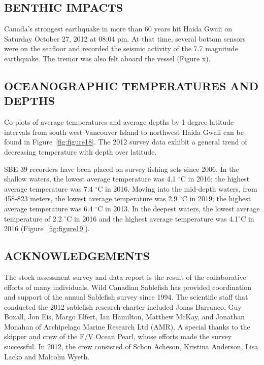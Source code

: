 \documentclass[12pt]{article}\usepackage[]{graphicx}\usepackage[]{color}
\begin{document}
\hypertarget{benthic-impacts}{%
\subsection{BENTHIC IMPACTS}\label{benthic-impacts}}

Canada's strongest earthquake in more than 60 years hit Haida Gwaii on Saturday October 27, 2012 at 08:04 pm. At that time, several bottom sensors were on the seafloor and recorded the seismic activity of the 7.7 magnitude earthquake. The tremor was also felt aboard the vessel (Figure x).

\hypertarget{oceanographic-temperatures-and-depths}{%
\subsection{OCEANOGRAPHIC TEMPERATURES AND DEPTHS}\label{oceanographic-temperatures-and-depths}}

Co-plots of average temperatures and average depths by 1-degree latitude intervals from south-west Vancouver Island to northwest Haida Gwaii can be found in Figure~\ref{fig:figure18}. The 2012 survey data exhibit a general trend of decreasing temperature with depth over latitude.

SBE 39 recorders have been placed on survey fishing sets since 2006. In the shallow waters, the lowest average temperature was 4.1 \(^\circ\)C in 2016; the highest average temperature was 7.4 \(^\circ\)C in 2016. Moving into the mid-depth waters, from 458-823 meters, the lowest average temperature was 2.9 \(^\circ\)C in 2019; the highest average temperature was 6.4 \(^\circ\)C in 2013. In the deepest waters, the lowest average temperature of 2.2 \(^\circ\)C in 2016 and the highest average temperature was 4.1\(^\circ\)C in 2016 (Figure~\ref{fig:figure19}).

\hypertarget{acknowledgements}{%
\subsection{ACKNOWLEDGEMENTS}\label{acknowledgements}}

The stock assessment survey and data report is the result of the collaborative efforts of many individuals. Wild Canadian Sablefish has provided coordination and support of the annual Sablefish survey since 1994. The scientific staff that conducted the 2012 sablefish research charter included Jonas Barranco, Guy Boxall, Jon Eis, Margo Elfert, Ian Hamilton, Matthew McKay, and Jonathan Monahan of Archipelago Marine Research Ltd (AMR). A special thanks to the skipper and crew of the F/V Ocean Pearl, whose efforts made the survey successful. In 2012, the crew consisted of Schon Acheson, Kristina Anderson, Lisa Lacko and Malcolm Wyeth.
\end{document}
